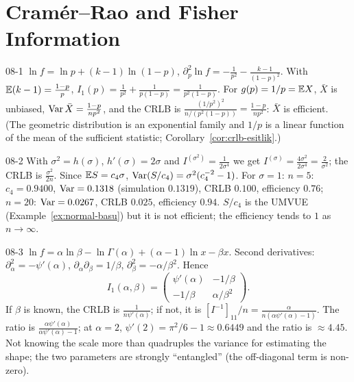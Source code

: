 \section{Cramér--Rao and Fisher Information}

\begin{solution}{08-1}
$\ln f=\ln p+(k-1)\ln(1-p)$, $\partial^2_p\ln f=-\frac1{p^2}-\frac{k-1}{(1-p)^2}$. With $\mathbb{E}(k-1)=\frac{1-p}{p}$, $I_1(p)=\frac1{p^2}+\frac{1}{p(1-p)}=\frac{1}{p^2(1-p)}$. For $g(p)=1/p=\mathbb{E} X$, $\bar X$ is unbiased, $\operatorname{Var}\bar X=\frac{1-p}{np^2}$, and the CRLB is $\frac{(1/p^2)^2}{n/(p^2(1-p))}=\frac{1-p}{np^2}$: $\bar X$ is efficient. (The geometric distribution is an exponential family and $1/p$ is a linear function of the mean of the sufficient statistic; Corollary~\ref{cor:crlb-esitlik}.)
\end{solution}

\begin{solution}{08-2}
With $\sigma^2=h(\sigma)$, $h'(\sigma)=2\sigma$ and $I^{(\sigma^2)}=\frac{1}{2\sigma^4}$ we get $I^{(\sigma)}=\frac{4\sigma^2}{2\sigma^4}=\frac{2}{\sigma^2}$; the CRLB is $\frac{\sigma^2}{2n}$. Since $\mathbb{E} S=c_4\sigma$, $\operatorname{Var}(S/c_4)=\sigma^2(c_4^{-2}-1)$. For $\sigma=1$:
$n=5$: $c_4=0.9400$, $\operatorname{Var}=0.1318$ (simulation $0.1319$), CRLB $0.100$, efficiency $0.76$;
$n=20$: $\operatorname{Var}=0.0267$, CRLB $0.025$, efficiency $0.94$. $S/c_4$ is the UMVUE (Example~\ref{ex:normal-basu}) but it is not efficient; the efficiency tends to $1$ as $n\to\infty$.
\end{solution}

\begin{solution}{08-3}
$\ln f=\alpha\ln\beta-\ln\Gamma(\alpha)+(\alpha-1)\ln x-\beta x$. Second derivatives: $\partial^2_\alpha=-\psi'(\alpha)$, $\partial_\alpha\partial_\beta=1/\beta$, $\partial^2_\beta=-\alpha/\beta^2$. Hence
\[
I_1(\alpha,\beta)=\begin{pmatrix}\psi'(\alpha)&-1/\beta\\-1/\beta&\alpha/\beta^2\end{pmatrix}.
\]
If $\beta$ is known, the CRLB is $\frac{1}{n\psi'(\alpha)}$; if not, it is $[I^{-1}]_{11}/n=\frac{\alpha}{n(\alpha\psi'(\alpha)-1)}$. The ratio is $\frac{\alpha\psi'(\alpha)}{\alpha\psi'(\alpha)-1}$; at $\alpha=2$, $\psi'(2)=\pi^2/6-1\approx0.6449$ and the ratio is $\approx4.45$. Not knowing the scale more than quadruples the variance for estimating the shape; the two parameters are strongly ``entangled'' (the off-diagonal term is non-zero).
\end{solution}

